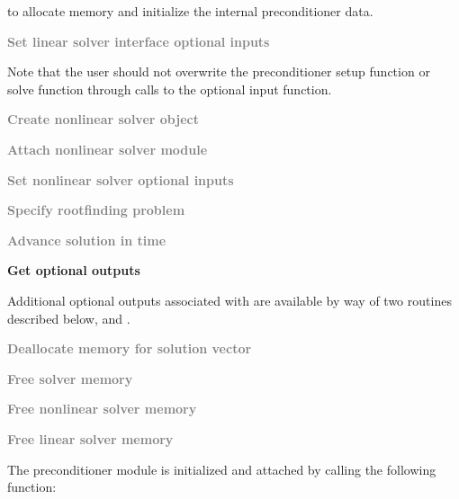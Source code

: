 \begin{Steps}

  to allocate memory and initialize the internal preconditioner data.

\item
  \textcolor{gray}{\bf Set linear solver interface optional inputs}

  Note that the user should not overwrite the preconditioner setup function
  or solve function through calls to the 
  optional input function.

\item
  \textcolor{gray}{\bf Create nonlinear solver object}

\item
  \textcolor{gray}{\bf Attach nonlinear solver module}

\item
  \textcolor{gray}{\bf Set nonlinear solver optional inputs}

\item
  \textcolor{gray}{\bf Specify rootfinding problem}

\item
  \textcolor{gray}{\bf Advance solution in time}

\item
  {\bf Get optional outputs}

  Additional optional outputs associated with {\cvbandpre} are available by
  way of two routines described below,
   and .

\item
  \textcolor{gray}{\bf Deallocate memory for solution vector}

\item
  \textcolor{gray}{\bf Free solver memory}

\item
  \textcolor{gray}{\bf Free nonlinear solver memory}

\item
  \textcolor{gray}{\bf Free linear solver memory}

\end{Steps}
The {\cvbandpre} preconditioner module is initialized and attached
by calling the following function:
